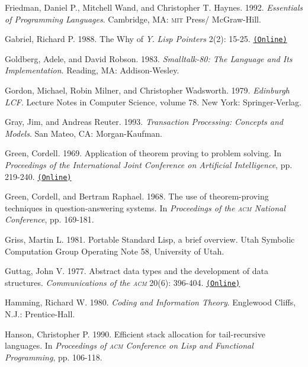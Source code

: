 \documentclass[8pt,oneside]{book}
\newcommand{\acronym}[1]{\textsc{\MakeLowercase{#1}}}
\newcommand{\code}[1]{\texttt{#1}}
\begin{document}
 \label{Friedman et al. 1992}
Friedman, Daniel P., Mitchell Wand, and Christopher T. Haynes. 1992.
\textit{Essentials of Programming Languages}.  Cambridge, MA: \acronym{MIT}
Press/ McGraw-Hill.

 \label{Gabriel 1988}
Gabriel, Richard P. 1988.  The Why of \emph{Y}.  \textit{Lisp Pointers}
2(2): 15-25.
\href{http://www.dreamsongs.com/Files/WhyOfY.pdf}{\code{(Online)}}

Goldberg, Adele, and David Robson.  1983.  \textit{Smalltalk-80: The Language and
Its Implementation}. Reading, MA: Addison-Wesley.

 \label{Gordon et al. 1979}
Gordon, Michael, Robin Milner, and Christopher Wadsworth.  1979.
\textit{Edinburgh LCF}. Lecture Notes in Computer Science, volume 78. New York:
Springer-Verlag.

 \label{Gray and Reuter 1993}
Gray, Jim, and Andreas Reuter. 1993. \textit{Transaction Processing: Concepts and
Models}. San Mateo, CA: Morgan-Kaufman.

 \label{Green 1969}
Green, Cordell.  1969.  Application of theorem proving to problem solving.  In
\textit{Proceedings of the International Joint Conference on Artificial
Intelligence}, pp. 219-240.
\href{http://citeseer.ist.psu.edu/viewdoc/summary?doi=10.1.1.81.9820}{\code{(Online)}}

 \label{Green and Raphael (1968)}
Green, Cordell, and Bertram Raphael.  1968.  The use of theorem-proving
techniques in question-answering systems.  In \textit{Proceedings of the
\acronym{ACM} National Conference}, pp. 169-181.

 \label{Griss 1981}
Griss, Martin L.  1981.  Portable Standard Lisp, a brief overview.  Utah
Symbolic Computation Group Operating Note 58, University of Utah.

 \label{Guttag 1977}
Guttag, John V.  1977.  Abstract data types and the development of data
structures.  \textit{Communications of the \acronym{ACM}} 20(6): 396-404.
\href{http://www.unc.edu/~stotts/comp723/guttagADT77.pdf}{\code{(Online)}}

 \label{Hamming 1980}
Hamming, Richard W.  1980.  \textit{Coding and Information Theory}.  Englewood
Cliffs, N.J.: Prentice-Hall.

 \label{Hanson 1990}
Hanson, Christopher P.  1990.  Efficient stack allocation for tail-recur\-sive
languages.  In \textit{Proceedings of \acronym{ACM} Conference on Lisp and
Functional Programming}, pp. 106-118.
\end{document}
